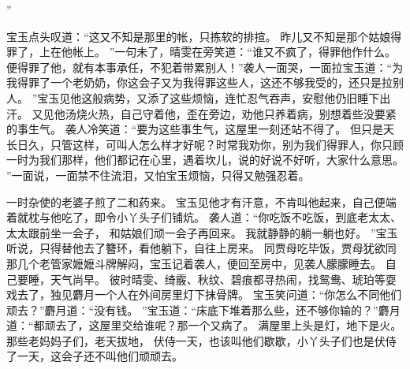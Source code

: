 ”\par
宝玉点头叹道：“这又不知是那里的帐，只拣软的排揎。
昨儿又不知是那个姑娘得罪了，上在他帐上。
”一句未了，晴雯在旁笑道：“谁又不疯了，得罪他作什么。
便得罪了他，就有本事承任，不犯着带累别人！”袭人一面哭，一面拉宝玉道：“为我得罪了一个老奶奶，你这会子又为我得罪这些人，这还不够我受的，还只是拉别人。
”宝玉见他这般病势，又添了这些烦恼，连忙忍气吞声，安慰他仍旧睡下出汗。
又见他汤烧火热，自己守着他，歪在旁边，劝他只养着病，别想着些没要紧的事生气。
袭人冷笑道：“要为这些事生气，这屋里一刻还站不得了。
但只是天长日久，只管这样，可叫人怎么样才好呢？时常我劝你，别为我们得罪人，你只顾一时为我们那样，他们都记在心里，遇着坎儿，说的好说不好听，大家什么意思。
”一面说，一面禁不住流泪，又怕宝玉烦恼，只得又勉强忍着。
\par
一时杂使的老婆子煎了二和药来。
宝玉见他才有汗意，不肯叫他起来，自己便端着就枕与他吃了，即令小丫头子们铺炕。
袭人道：“你吃饭不吃饭，到底老太太、太太跟前坐一会子，
和姑娘们顽一会子再回来。
我就静静的躺一躺也好。
”宝玉听说，只得替他去了簪环，看他躺下，自往上房来。
同贾母吃毕饭，贾母犹欲同那几个老管家嬷嬷斗牌解闷，宝玉记着袭人，便回至房中，见袭人朦朦睡去。
自己要睡，天气尚早。
彼时晴雯、绮霰、秋纹、碧痕都寻热闹，找鸳鸯、琥珀等耍戏去了，独见麝月一个人在外间房里灯下抹骨牌。
宝玉笑问道：“你怎么不同他们顽去？”麝月道：“没有钱。
”宝玉道：“床底下堆着那么些，还不够你输的？”麝月道：“都顽去了，这屋里交给谁呢？那一个又病了。
满屋里上头是灯，地下是火。
那些老妈妈子们，老天拔地，
伏侍一天，也该叫他们歇歇，小丫头子们也是伏侍了一天，这会子还不叫他们顽顽去。
